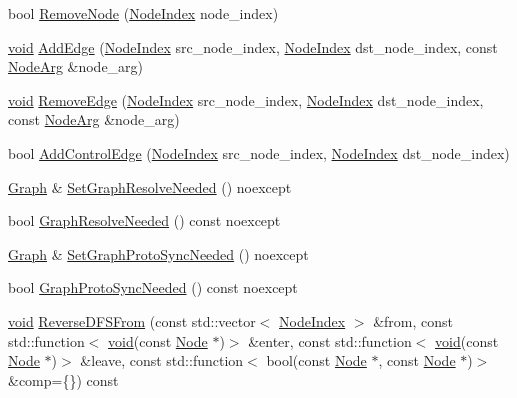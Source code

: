 \begin{DoxyCompactItemize}
\item 
bool \mbox{\hyperlink{classonnxruntime_1_1Graph_a44fd12c96e89cbdd1517ae959069d7e1}{Remove\+Node}} (\mbox{\hyperlink{namespaceonnxruntime_af8773b5c12b5d8fd9292eb2e268df760}{Node\+Index}} node\+\_\+index)
\item 
\mbox{\hyperlink{mlasi_8h_a88f941d423cb2a819b70a1358982b1a6}{void}} \mbox{\hyperlink{classonnxruntime_1_1Graph_a58c003d4e931a6e36e425488873aabf0}{Add\+Edge}} (\mbox{\hyperlink{namespaceonnxruntime_af8773b5c12b5d8fd9292eb2e268df760}{Node\+Index}} src\+\_\+node\+\_\+index, \mbox{\hyperlink{namespaceonnxruntime_af8773b5c12b5d8fd9292eb2e268df760}{Node\+Index}} dst\+\_\+node\+\_\+index, const \mbox{\hyperlink{classonnxruntime_1_1NodeArg}{Node\+Arg}} \&node\+\_\+arg)
\item 
\mbox{\hyperlink{mlasi_8h_a88f941d423cb2a819b70a1358982b1a6}{void}} \mbox{\hyperlink{classonnxruntime_1_1Graph_adabb88e56d16bc912e5fb8ffe54f6d6b}{Remove\+Edge}} (\mbox{\hyperlink{namespaceonnxruntime_af8773b5c12b5d8fd9292eb2e268df760}{Node\+Index}} src\+\_\+node\+\_\+index, \mbox{\hyperlink{namespaceonnxruntime_af8773b5c12b5d8fd9292eb2e268df760}{Node\+Index}} dst\+\_\+node\+\_\+index, const \mbox{\hyperlink{classonnxruntime_1_1NodeArg}{Node\+Arg}} \&node\+\_\+arg)
\item 
bool \mbox{\hyperlink{classonnxruntime_1_1Graph_aa348aa7dc35abaeb91399992122e9b11}{Add\+Control\+Edge}} (\mbox{\hyperlink{namespaceonnxruntime_af8773b5c12b5d8fd9292eb2e268df760}{Node\+Index}} src\+\_\+node\+\_\+index, \mbox{\hyperlink{namespaceonnxruntime_af8773b5c12b5d8fd9292eb2e268df760}{Node\+Index}} dst\+\_\+node\+\_\+index)
\item 
\mbox{\hyperlink{classonnxruntime_1_1Graph}{Graph}} \& \mbox{\hyperlink{classonnxruntime_1_1Graph_abd668cfb112919d34b6260ebb2084742}{Set\+Graph\+Resolve\+Needed}} () noexcept
\item 
bool \mbox{\hyperlink{classonnxruntime_1_1Graph_af84afc5b0cb3876c1860c19c4ea249d7}{Graph\+Resolve\+Needed}} () const noexcept
\item 
\mbox{\hyperlink{classonnxruntime_1_1Graph}{Graph}} \& \mbox{\hyperlink{classonnxruntime_1_1Graph_a086860d8eaa4f562e97d0ebbec731819}{Set\+Graph\+Proto\+Sync\+Needed}} () noexcept
\item 
bool \mbox{\hyperlink{classonnxruntime_1_1Graph_ae1709643bf3a2f41c7ef59b532590a0f}{Graph\+Proto\+Sync\+Needed}} () const noexcept
\item 
\mbox{\hyperlink{mlasi_8h_a88f941d423cb2a819b70a1358982b1a6}{void}} \mbox{\hyperlink{classonnxruntime_1_1Graph_a1b4379710f3916fd237e2692c130ddd5}{Reverse\+D\+F\+S\+From}} (const std\+::vector$<$ \mbox{\hyperlink{namespaceonnxruntime_af8773b5c12b5d8fd9292eb2e268df760}{Node\+Index}} $>$ \&from, const std\+::function$<$ \mbox{\hyperlink{mlasi_8h_a88f941d423cb2a819b70a1358982b1a6}{void}}(const \mbox{\hyperlink{classonnxruntime_1_1Node}{Node}} $\ast$)$>$ \&enter, const std\+::function$<$ \mbox{\hyperlink{mlasi_8h_a88f941d423cb2a819b70a1358982b1a6}{void}}(const \mbox{\hyperlink{classonnxruntime_1_1Node}{Node}} $\ast$)$>$ \&leave, const std\+::function$<$ bool(const \mbox{\hyperlink{classonnxruntime_1_1Node}{Node}} $\ast$, const \mbox{\hyperlink{classonnxruntime_1_1Node}{Node}} $\ast$)$>$ \&comp=\{\}) const

\end{DoxyCompactItemize}
